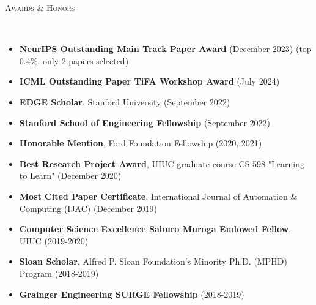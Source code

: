 \documentclass{article}
\newenvironment{changemargin}[2]{%
  \begin{list}{}{%
    \setlength{\topsep}{0pt}%
    \setlength{\leftmargin}{#1}%
    \setlength{\rightmargin}{#2}%
    \setlength{\listparindent}{\parindent}%
    \setlength{\itemindent}{\parindent}%
    \setlength{\parsep}{\parskip}%
  }%
  \item[]}{\end{list}
}
\newcommand{\lineover}{
	\begin{changemargin}{-0.05in}{-0.05in}
		\vspace*{-8pt}
		\hrulefill \\
		\vspace*{-2pt}
	\end{changemargin}
}
\newcommand{\header}[1]{
	\begin{changemargin}{-0.5in}{-0.5in}
		\scshape{#1}\\
  	\lineover
	\end{changemargin}
}
\newenvironment{body} {
	\vspace*{-16pt}
	\begin{changemargin}{-0.25in}{-0.5in}
  }	
	{\end{changemargin}
}
\begin{document}
\smallskip

\header{Awards \& Honors}
\begin{body}
\vspace{16pt}
\begin{itemize} \itemsep -2pt
    \item \textbf{NeurIPS Outstanding Main Track Paper Award} (December 2023) (top 0.4\%, only 2 papers selected)
    \item \textbf{ICML Outstanding Paper TiFA Workshop Award} (July 2024)
    \item \textbf{EDGE Scholar}, Stanford University (September 2022)
    \item \textbf{Stanford School of Engineering Fellowship} (September 2022)
    \item \textbf{Honorable Mention}, Ford Foundation Fellowship (2020, 2021)
    \item \textbf{Best Research Project Award}, UIUC graduate course CS 598 "Learning to Learn" (December 2020)
    \item \textbf{Most Cited Paper Certificate}, International Journal of Automation \& Computing (IJAC) (December 2019)
    \item \textbf{Computer Science Excellence Saburo Muroga Endowed Fellow}, UIUC (2019-2020)
	\item \textbf{Sloan Scholar}, Alfred P. Sloan Foundation's Minority Ph.D. (MPHD) Program (2018-2019)
	\item \textbf{Grainger Engineering SURGE Fellowship} (2018-2019)
\end{itemize}
\end{body}
\end{document}

